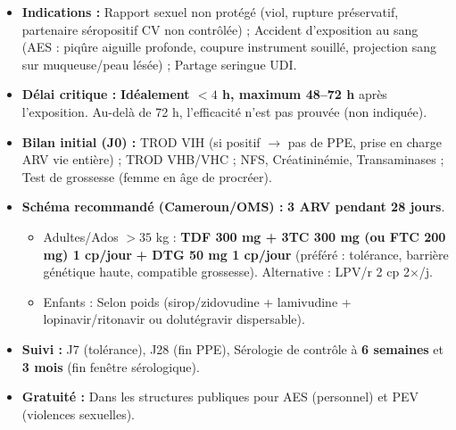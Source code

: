 \documentclass[11pt]{article}
\begin{document}
\begin{propriete}
\begin{itemize}
    \item \textbf{Indications :} Rapport sexuel non protégé (viol, rupture préservatif, partenaire séropositif CV non contrôlée) ; Accident d'exposition au sang (AES : piqûre aiguille profonde, coupure instrument souillé, projection sang sur muqueuse/peau lésée) ; Partage seringue UDI.
    \item \textbf{Délai critique :} \textbf{Idéalement $< 4$ h, maximum 48--72 h} après l'exposition. Au-delà de 72 h, l'efficacité n'est pas prouvée (non indiquée).
    \item \textbf{Bilan initial (J0) :} TROD VIH (si positif $\rightarrow$ pas de PPE, prise en charge ARV vie entière) ; TROD VHB/VHC ; NFS, Créatininémie, Transaminases ; Test de grossesse (femme en âge de procréer).
    \item \textbf{Schéma recommandé (Cameroun/OMS) :} \textbf{3 ARV pendant 28 jours}.
    \begin{itemize}
        \item Adultes/Ados $> 35$ kg : \textbf{TDF 300 mg + 3TC 300 mg (ou FTC 200 mg) 1 cp/jour} \textbf{+ DTG 50 mg 1 cp/jour} (préféré : tolérance, barrière génétique haute, compatible grossesse). Alternative : LPV/r 2 cp 2$\times$/j.
        \item Enfants : Selon poids (sirop/zidovudine + lamivudine + lopinavir/ritonavir ou dolutégravir dispersable).
    \end{itemize}
    \item \textbf{Suivi :} J7 (tolérance), J28 (fin PPE), Sérologie de contrôle à \textbf{6 semaines} et \textbf{3 mois} (fin fenêtre sérologique).
    \item \textbf{Gratuité :} Dans les structures publiques pour AES (personnel) et PEV (violences sexuelles).
\end{itemize}
\end{propriete}
\end{document}
